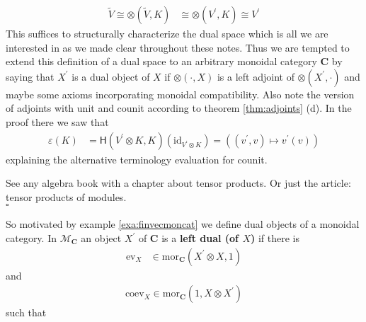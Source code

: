 \begin{exa}
\begin{align*}
  \tilde{V}
  \cong
  \otimes(\tilde{V},K)
  &\cong
  \otimes(V^{\prime},K)
  \cong
  V^{\prime}
\end{align*}
This suffices to structurally characterize the dual space which is all we are interested in as we made clear throughout these notes. Thus we are tempted to extend this definition of a dual space to an arbitrary monoidal category $\mathbf{C}$ by saying that $X^{\prime}$ is a dual object of $X$ if $\otimes(\cdot,X)$ is a left adjoint of $\otimes(X^{\prime},\cdot)$ and maybe some axioms incorporating monoidal compatibility. Also note the version of adjoints with unit and counit according to theorem \ref{thm:adjoints} (d). In the proof there we saw that
\begin{align*}
  \varepsilon(K)
  &=
  \mathsf{H}(V^{\prime} \otimes K,K)
  \left(
    \mathrm{id}_{V^{\prime} \otimes K}
  \right)
  =
  \left(
    (v^{\prime},v)
    \mapsto
    v^{\prime}(v)
  \right)
\end{align*}
explaining the alternative terminology evaluation for counit.
\end{exa}
\begin{prf}
See any algebra book with a chapter about tensor products. Or just the \cite{wiki-pedia0en} article: tensor products of modules.
\\
\phantom{proven}
\hfill
$\square$
\end{prf}
So motivated by example \ref{exa:finvecmoncat} we define dual objects of a monoidal category. In $\mathcal{M}_{\mathbf{C}}$ an object $X^{\prime}$ of $\mathbf{C}$ is a \textbf{left dual (of $X$)} if there is
\begin{align*}
  \mathrm{ev}_{X}
  &\in
  \mathrm{mor}_{\mathbf{C}}
  \left(
    X^{\prime}
    \otimes
    X,
    1
  \right)
\end{align*}
and
\begin{align*}
  \mathrm{coev}_{X}
  \in
  \mathrm{mor}_{\mathbf{C}}
  \left(
    1,
    X
    \otimes
    X^{\prime}
  \right)
\end{align*}
such that
